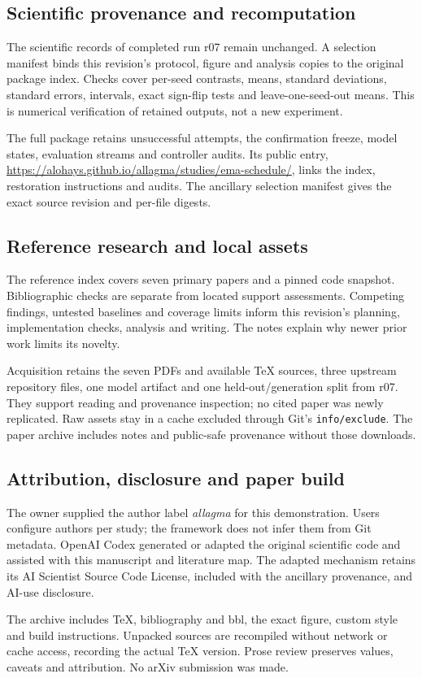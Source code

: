 \subsection{Scientific provenance and recomputation}
The scientific records of completed run r07 remain unchanged. A selection
manifest binds this revision's protocol, figure and analysis copies to the
original package index. 
Checks cover per-seed contrasts, means, standard deviations, standard
errors, intervals, exact sign-flip tests and leave-one-seed-out means.
This is numerical verification of retained outputs, not a new experiment.

The full package retains unsuccessful attempts, the confirmation freeze,
model states, evaluation streams and controller audits. Its public entry,
\url{https://alohays.github.io/allagma/studies/ema-schedule/}, links the
index, restoration instructions and audits. The ancillary selection
manifest gives the exact source revision and per-file digests.

\subsection{Reference research and local assets}
The reference index covers seven primary papers and a pinned code
snapshot. Bibliographic checks are separate from located support
assessments. Competing findings, untested baselines and coverage limits
inform this revision's planning, implementation checks, analysis and
writing. The notes explain why newer prior work limits its novelty.

Acquisition retains the seven PDFs and available TeX sources, three
upstream repository files, one model artifact and one held-out/generation
split from r07. They support reading and provenance inspection; no cited
paper was newly replicated. Raw assets stay in a cache excluded through
Git's \texttt{info/exclude}. The paper archive includes notes and public-safe
provenance without those downloads.

\subsection{Attribution, disclosure and paper build}
The owner supplied the author label \emph{allagma} for this demonstration.
Users configure authors per study; the framework does not infer them from
Git metadata. OpenAI Codex generated or adapted the original scientific
code and assisted with this manuscript and literature map. The adapted
mechanism retains its AI Scientist Source Code License, included with the
ancillary provenance, and AI-use disclosure.

The archive includes TeX, bibliography and bbl, the exact figure, custom
style and build instructions. Unpacked sources are recompiled without
network or cache access, recording the actual TeX version. Prose review
preserves values, caveats and attribution. No arXiv submission was made.
